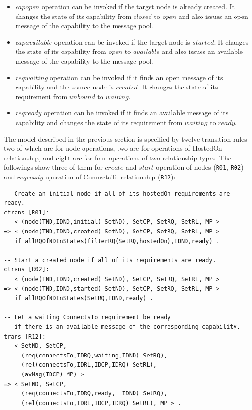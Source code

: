\documentclass[12pt]{report}
\begin{document}
\begin{description}
  \begin{itemize}
  \item $capopen$ operation can be invoked if the target node is
    already created. It changes the state of its capability from
    $closed$ to $open$ and also issues an open message of the
    capability to the message pool.
  \item $capavailable$ operation can be invoked if the target node is
    $started$. It changes the state of its capability from $open$ to
    $available$ and also issues an available message of the capability
    to the message pool.
  \item $reqwaiting$ operation can be invoked if it finds an open
    message of its capability and the source node is $created$. It
    changes the state of its requirement from $unbound$ to $waiting$.
  \item $reqready$ operation can be invoked if it finds an available
    message of its capability and changes the state of its requirement from
    $waiting$ to $ready$.
  \end{itemize}
\end{description}
The model described in the previous section is specified by twelve
transition rules two of which are for node operations, two are for
operations of HostedOn relationship, and eight are for four operations
of two relationship types. The followings show three of them for
$create$ and $start$ operation of nodes ({\tt R01}, {\tt R02}) and
$reqready$ operation of ConnectsTo relationship ({\tt R12}):
\small
\begin{verbatim}
-- Create an initial node if all of its hostedOn requirements are ready.
ctrans [R01]: 
   < (node(TND,IDND,initial) SetND), SetCP, SetRQ, SetRL, MP >
=> < (node(TND,IDND,created) SetND), SetCP, SetRQ, SetRL, MP > 
   if allRQOfNDInStates(filterRQ(SetRQ,hostedOn),IDND,ready) .

-- Start a created node if all of its requirements are ready.
ctrans [R02]: 
   < (node(TND,IDND,created) SetND), SetCP, SetRQ, SetRL, MP >
=> < (node(TND,IDND,started) SetND), SetCP, SetRQ, SetRL, MP > 
   if allRQOfNDInStates(SetRQ,IDND,ready) .

-- Let a waiting ConnectsTo requirement be ready
-- if there is an available message of the corresponding capability.
trans [R12]: 
   < SetND, SetCP, 
     (req(connectsTo,IDRQ,waiting,IDND) SetRQ),
     (rel(connectsTo,IDRL,IDCP,IDRQ) SetRL), 
     (avMsg(IDCP) MP) >
=> < SetND, SetCP, 
     (req(connectsTo,IDRQ,ready,  IDND) SetRQ), 
     (rel(connectsTo,IDRL,IDCP,IDRQ) SetRL), MP > .
\end{verbatim}
\end{document}
